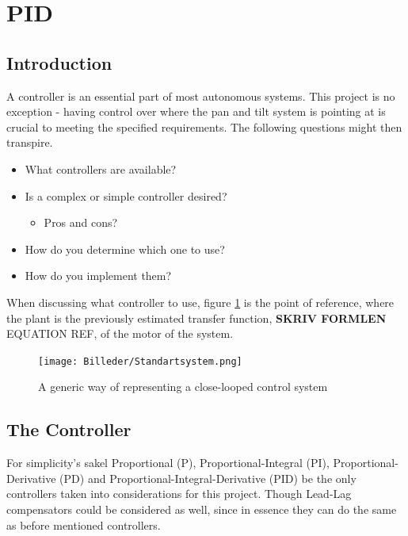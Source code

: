 \newpage

\section{PID}
\subsection{Introduction}
A controller is an essential part of most autonomous systems. This project is no exception - having control over where the pan and tilt system is pointing at is crucial to meeting the specified requirements. The following questions might then transpire. 

\begin{itemize}

\item What controllers are available?

\item Is a complex or simple controller desired?

	\begin{itemize}
    \item Pros and cons?
    \end{itemize}

\item How do you determine which one to use?

\item How do you implement them?

\end{itemize}

When discussing what controller to use, figure \ref{fig:Standartsystem} is the point of reference, where the plant is the previously estimated transfer function, \textbf{SKRIV FORMLEN} EQUATION REF, of the motor of the system.

\begin{figure}[h!]
\centering
\texttt{[image: Billeder/Standartsystem.png]}
\caption{ A generic way of representing a close-looped control system }
\label{fig:Standartsystem}
\end{figure}

\newpage

\subsection{The Controller}
For simplicity’s sakel Proportional (P), Proportional-Integral (PI), Proportional-Derivative (PD) and Proportional-Integral-Derivative (PID) be the only controllers taken into considerations for this project. Though Lead-Lag compensators could be considered as well, since in essence they can do the same as before mentioned controllers.\par

